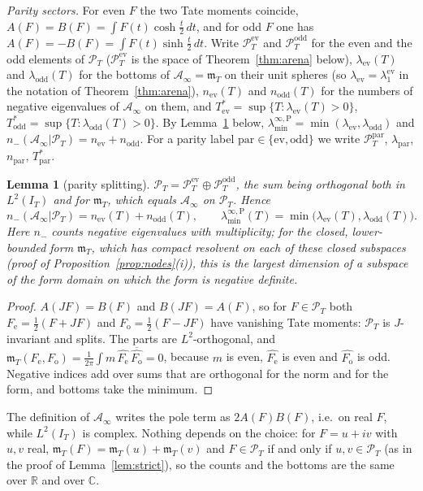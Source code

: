 \documentclass[11pt]{amsart}
\newtheorem{lemma}[theorem]{Lemma}
\theoremstyle{definition}
\theoremstyle{remark}
\newcommand{\C}{\mathbb C}
\newcommand{\R}{\mathbb R}
\newcommand{\PT}{\mathcal P_T}
\newcommand{\IT}{I_T}
\newcommand{\Ainf}{\mathcal A_\infty}
\newcommand{\mT}{\mathfrak m_T}
\newcommand{\laminfP}{\lambda^{\infty,\mathrm P}_{\min}}
\begin{document}
\emph{Parity sectors.} For even $F$ the two Tate moments coincide,
$A(F)=B(F)=\int F(t)\cosh\frac t2\,dt$, and for odd $F$ one has $A(F)=-B(F)=\int F(t)\sinh\frac t2\,dt$.
Write $\PT^{\mathrm{ev}}$ and $\PT^{\mathrm{odd}}$ for the even and the odd elements of $\PT$
($\PT^{\mathrm{ev}}$ is the space of Theorem~\ref{thm:arena} below), $\lambda_{\mathrm{ev}}(T)$ and
$\lambda_{\mathrm{odd}}(T)$ for the bottoms of $\Ainf=\mT$ on their unit spheres (so
$\lambda_{\mathrm{ev}}=\lambda^{\mathrm{ev}}_1$ in the notation of Theorem~\ref{thm:arena}),
$n_{\mathrm{ev}}(T)$ and $n_{\mathrm{odd}}(T)$ for the numbers of negative eigenvalues of $\Ainf$ on them,
and $T^*_{\mathrm{ev}}=\sup\{T:\lambda_{\mathrm{ev}}(T)>0\}$, $T^*_{\mathrm{odd}}=\sup\{T:\lambda_{\mathrm{odd}}(T)>0\}$.
By Lemma~\ref{lem:parity} below, $\laminfP=\min(\lambda_{\mathrm{ev}},\lambda_{\mathrm{odd}})$
and $n_-(\Ainf|\PT)=n_{\mathrm{ev}}+n_{\mathrm{odd}}$. For a parity label $\mathrm{par}\in\{\mathrm{ev},\mathrm{odd}\}$
we write $\PT^{\mathrm{par}}$, $\lambda_{\mathrm{par}}$, $n_{\mathrm{par}}$, $T^*_{\mathrm{par}}$.

\begin{lemma}[parity splitting]\label{lem:parity}
$\PT=\PT^{\mathrm{ev}}\oplus\PT^{\mathrm{odd}}$, the sum being orthogonal both in
$L^2(\IT)$ and for $\mT$, which equals $\Ainf$ on $\PT$. Hence
\[
n_-(\Ainf|\PT)=n_{\mathrm{ev}}(T)+n_{\mathrm{odd}}(T),\qquad
\laminfP(T)=\min\big(\lambda_{\mathrm{ev}}(T),\lambda_{\mathrm{odd}}(T)\big).
\]
Here $n_-$ counts negative eigenvalues with multiplicity; for the closed,
lower-bounded form $\mT$, which has compact resolvent on each of these closed subspaces (proof of
Proposition~\ref{prop:nodes}(i)), this is the largest dimension of a subspace of the form domain on
which the form is negative definite.
\end{lemma}
\begin{proof}
$A(JF)=B(F)$ and $B(JF)=A(F)$, so for $F\in\PT$ both $F_{\mathrm e}=\frac12(F+JF)$ and
$F_{\mathrm o}=\frac12(F-JF)$ have vanishing Tate moments: $\PT$ is $J$-invariant and splits. The
parts are $L^2$-orthogonal, and
$\mT(F_{\mathrm e},F_{\mathrm o})=\frac1{2\pi}\int m\,\widehat{F_{\mathrm e}}\,\overline{\widehat{F_{\mathrm o}}}=0$,
because $m$ is even, $\widehat{F_{\mathrm e}}$ is even and $\widehat{F_{\mathrm o}}$ is odd. Negative
indices add over sums that are orthogonal for the norm and for the form, and bottoms take the minimum.
\end{proof}
The definition of $\Ainf$ writes the pole term as $2A(F)B(F)$, i.e.\ on real $F$, while $L^2(\IT)$ is
complex. Nothing depends on the choice: for $F=u+iv$ with $u,v$ real, $\mT(F)=\mT(u)+\mT(v)$
and $F\in\PT$ if and only if $u,v\in\PT$ (as in the proof of Lemma~\ref{lem:strict}), so the counts and
the bottoms are the same over $\R$ and over $\C$.
\end{document}
